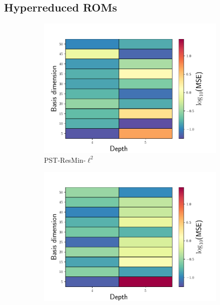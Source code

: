 \documentclass[3p,computermodern,10pt]{elsarticle}
\begin{document}
\subsection{Hyperreduced ROMs}

\begin{figure}
\begin{center}
\begin{subfigure}[t]{0.32\textwidth}
\includegraphics[trim={0cm 0cm 0cm 0cm},clip,width=1.0\linewidth]{code/burgers/synapse_models/basis_study/results_hyperreduction/MSE_LS.pdf}
\caption{PST-ResMin-$\ell^2$}
\label{fig:burg_rom_results1}
\end{subfigure}
\begin{subfigure}[t]{0.32\textwidth}
\includegraphics[trim={0cm 0cm 0cm 0cm},clip,width=1.0\linewidth]{code/burgers/synapse_models/basis_study/results_hyperreduction/MSE_ML.pdf}

\end{subfigure}
\end{center}
\end{figure}
\end{document}
